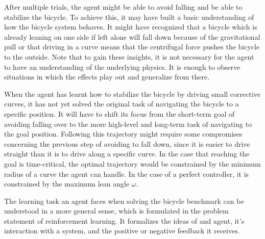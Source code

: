 After multiple trials, the agent might be able to avoid falling and be able to stabilize the bicycle.
To achieve this, it may have built a basic understanding of how the bicycle system behaves.
It might have recognized that a bicycle which is already leaning on one side if left alone will fall down because of the gravitational pull or that driving in a curve means that the centrifugal force pushes the bicycle to the outside.
Note that to gain these insights, it is not necessary for the agent to have an understanding of the underlying physics.
It is enough to observe situations in which the effects play out and generalize from there.

When the agent has learnt how to stabilize the bicycle by driving small corrective curves, it has not yet solved the original task of navigating the bicycle to a specific position.
It will have to shift its focus from the short-term goal of avoiding falling over to the more high-level and long-term task of navigating to the goal position.
Following this trajectory might require some compromises concerning the previous step of avoiding to fall down, since it is easier to drive straight than it is to drive along a specific curve.
In the case that reaching the goal is time-critical, the optimal trajectory would be constrained by the minimum radius of a curve the agent can handle.
In the case of a perfect controller, it is constrained by the maximum lean angle $\omega$.

The learning task an agent faces when solving the bicycle benchmark can be understood in a more general sense, which is formulated in the problem statement of reinforcement learning.
It formalizes the ideas of and agent, it's interaction with a system, and the positive or negative feedback it receives.

